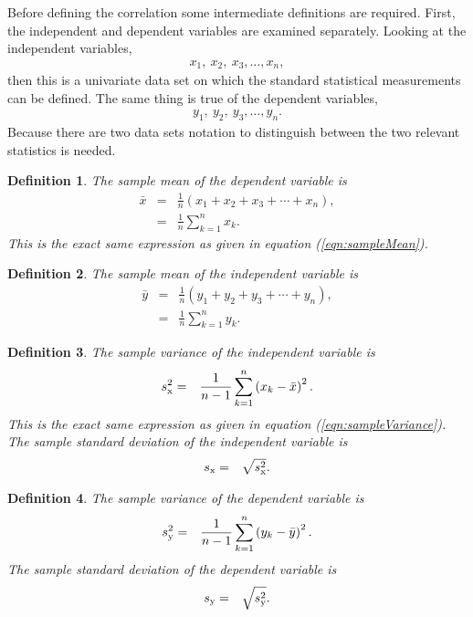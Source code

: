 \documentclass[12pt]{article}
\newtheorem{definition}{Definition}[section]
\newcommand{\lp}{\left(}
\newcommand{\rp}{\right)}
\begin{document}
Before defining the correlation some intermediate definitions are
required.  First, the independent and dependent variables are examined
separately.  Looking at the independent variables,
\begin{eqnarray*}
  x_1,~x_2,~x_3,\ldots,x_n,
\end{eqnarray*}
then this is a univariate data set on which the standard statistical
measurements can be defined.  The same thing is true of the dependent
variables,
\begin{eqnarray*}
  y_1,~y_2,~y_3,\ldots,y_n.
\end{eqnarray*}
Because there are two data sets notation to distinguish between the
two relevant statistics is needed.

\begin{definition}
  The sample mean of the dependent variable is 
  \begin{eqnarray}
    \bar{x} & = & \frac{1}{n} \lp x_1 + x_2 + x_3 + \cdots + x_n \rp, \\
    & = & \frac{1}{n} \sum^n_{k=1} x_k. \nonumber
  \end{eqnarray}
  This is the exact same expression as given in equation
  (\ref{eqn:sampleMean}).
\end{definition}

\begin{definition}
  The sample mean of the independent variable is 
  \begin{eqnarray}
    \bar{y} & = & \frac{1}{n} \lp y_1 + y_2 + y_3 + \cdots + y_n \rp, \\
    & = & \frac{1}{n} \sum^n_{k=1} y_k. \nonumber
  \end{eqnarray}
\end{definition}

\begin{definition}
  The sample variance of the independent variable is
  \begin{eqnarray}
    s^2_{\rm x} & = & \frac{1}{n-1} \sum^n_{k=1} \lp x_k - \bar{x} \rp^2.
  \end{eqnarray}  
  This is the exact same expression as given in equation
  (\ref{eqn:sampleVariance}).
  The sample standard deviation of the independent variable is
  \begin{eqnarray*}
    s_{\rm x} & = & \sqrt{s^2_{\rm x}}.
  \end{eqnarray*}
\end{definition}

\begin{definition}
  The sample variance of the dependent variable is
  \begin{eqnarray}
    s^2_{\rm y} & = & \frac{1}{n-1} \sum^n_{k=1} \lp y_k - \bar{y} \rp^2.
  \end{eqnarray}  
  The sample standard deviation of the dependent variable is
  \begin{eqnarray*}
    s_{\rm y} & = & \sqrt{s^2_{\rm y}}.
  \end{eqnarray*}
\end{definition}
\end{document}

